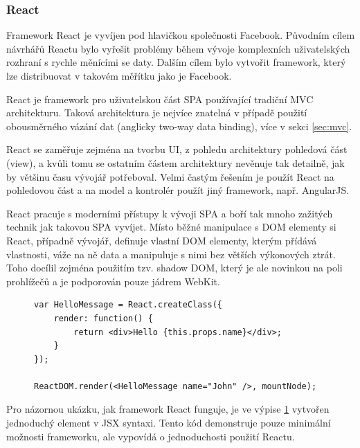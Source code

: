 \subsubsection*{React\cite{react}}
Framework React je vyvíjen pod hlavičkou společnosti Facebook. Původním cílem návrhářů Reactu bylo vyřešit problémy během vývoje komplexních uživatelských rozhraní s rychle měnícími se daty. Dalším cílem bylo vytvořit framework, který lze distribuovat v takovém měřítku jako je Facebook.

React je framework pro uživatelskou část SPA používající tradiční MVC architekturu. Taková architektura je nejvíce znatelná v případě použití obousměrného vázání dat (anglicky two-way data binding), více v sekci \ref{sec:mvc}.

React se zaměřuje zejména na tvorbu UI, z pohledu architektury pohledová část (view), a kvůli tomu se ostatním částem architektury nevěnuje tak detailně, jak by většinu času vývojář potřeboval. Velmi častým řešením je použít React na pohledovou část a na model a kontrolér použít jiný framework, např. AngularJS.

React pracuje s moderními přístupy k vývoji SPA a boří tak mnoho zažitých technik jak takovou SPA vyvíjet. Místo běžné manipulace s DOM elementy si React, případně vývojář, definuje vlastní DOM elementy, kterým přídává vlastnosti, váže na ně data a manipuluje s nimi bez větších výkonových ztrát. Toho docílil zejména použitím tzv. shadow DOM\cite{shadowdom}, který je ale novinkou na poli prohlížečů a je podporován pouze jádrem WebKit. 


\begin{figure}[ht]
\lstset{basicstyle=\small,style=JSON}
\begin{lstlisting}
var HelloMessage = React.createClass({
    render: function() {
        return <div>Hello {this.props.name}</div>;
    }
});

ReactDOM.render(<HelloMessage name="John" />, mountNode);
\end{lstlisting}
\label{code:react}
\end{figure}

Pro názornou ukázku, jak framework React funguje, je ve výpise \ref{code:react} vytvořen jednoduchý  element v JSX\cite{jsx} syntaxi. Tento kód demonstruje pouze minimální možnosti frameworku, ale vypovídá o jednoduchosti použití Reactu.

